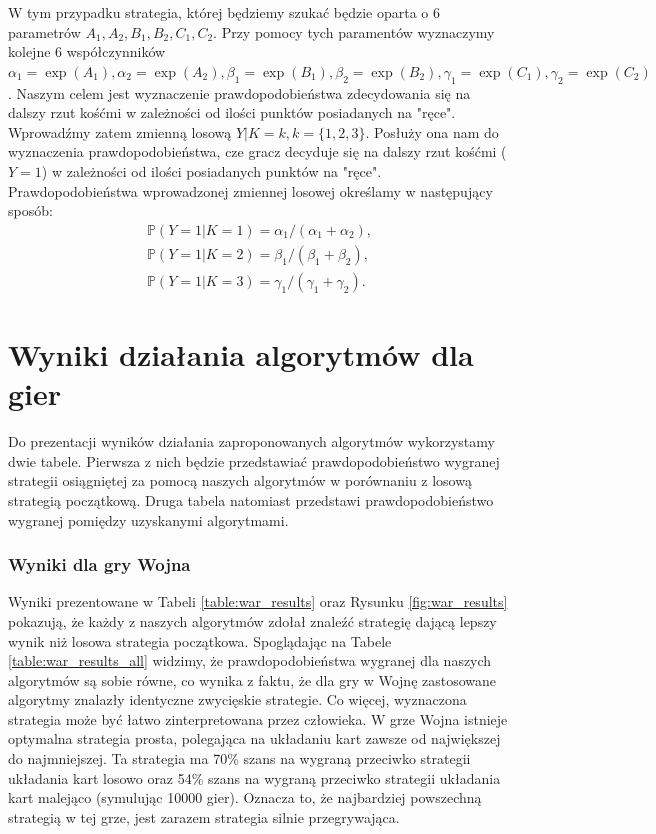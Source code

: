 \documentclass[inzynierska]{pwr_wmat_praca_dyplomowa}
\theoremstyle{plain}
\numberwithin{theorem}{chapter}
\theoremstyle{definition}
\numberwithin{theorem}{chapter}
\newcommand{\probP}{\mathbb{P}}
\begin{document}
	W tym przypadku strategia, której będziemy szukać będzie oparta o 6 parametrów $A_1, A_2, B_1, B_2, C_1, C_2$. Przy pomocy tych paramentów wyznaczymy kolejne 6 współczynników 
	$
	\alpha_1 = \exp(A_1),
	\alpha_2 = \exp(A_2), 
	\beta_1= \exp(B_1), 
	\beta_2= \exp(B_2), 
	\gamma_1= \exp(C_1), 
	\gamma_2= \exp(C_2)$. 
	Naszym celem jest wyznaczenie prawdopodobieństwa zdecydowania się na dalszy rzut kośćmi w zależności od ilości punktów posiadanych na "ręce". Wprowadźmy zatem  zmienną losową $Y|K=k, k=\{1, 2, 3\}$. Posłuży ona  nam do wyznaczenia prawdopodobieństwa, cze gracz decyduje się na dalszy rzut kośćmi ($Y=1$) w zależności od ilości posiadanych punktów na "ręce".  Prawdopodobieństwa wprowadzonej zmiennej losowej określamy w następujący sposób:  
	\begin{gather*}
	 \probP(Y = 1|K=1) = \alpha_1/(\alpha_1+\alpha_2),\\
	 \probP(Y = 1|K=2) = \beta_1/(\beta_1+\beta_2),\\
	 \probP(Y = 1|K=3) = \gamma_1/(\gamma_1+\gamma_2). 
	\end{gather*}


	
	\chapter{Wyniki działania algorytmów dla gier}
	Do prezentacji wyników działania zaproponowanych algorytmów wykorzystamy dwie tabele.
	Pierwsza z nich będzie przedstawiać prawdopodobieństwo wygranej strategii osiągniętej za pomocą naszych algorytmów w porównaniu z losową strategią początkową.
	Druga tabela natomiast przedstawi prawdopodobieństwo wygranej pomiędzy uzyskanymi algorytmami.
	
	\subsection*{Wyniki dla gry Wojna}
	Wyniki prezentowane w Tabeli \ref{table:war_results} oraz Rysunku \ref{fig:war_results} pokazują, że każdy z naszych algorytmów zdołał znaleźć strategię dającą lepszy wynik niż losowa strategia początkowa. Spoglądając na Tabele \ref{table:war_results_all} widzimy, że prawdopodobieństwa wygranej dla naszych algorytmów są sobie równe, co wynika z faktu, że dla gry w Wojnę zastosowane algorytmy znalazły identyczne zwycięskie strategie. Co więcej, wyznaczona strategia może być łatwo zinterpretowana przez człowieka. W grze Wojna istnieje optymalna strategia prosta, polegająca na układaniu kart zawsze od największej do najmniejszej. Ta strategia ma 70\% szans na wygraną przeciwko strategii układania kart losowo oraz 54\% szans na wygraną przeciwko strategii układania kart malejąco (symulując 10000 gier). Oznacza to, że najbardziej powszechną strategią w tej grze, jest zarazem strategia silnie przegrywająca.
	
\end{document}
